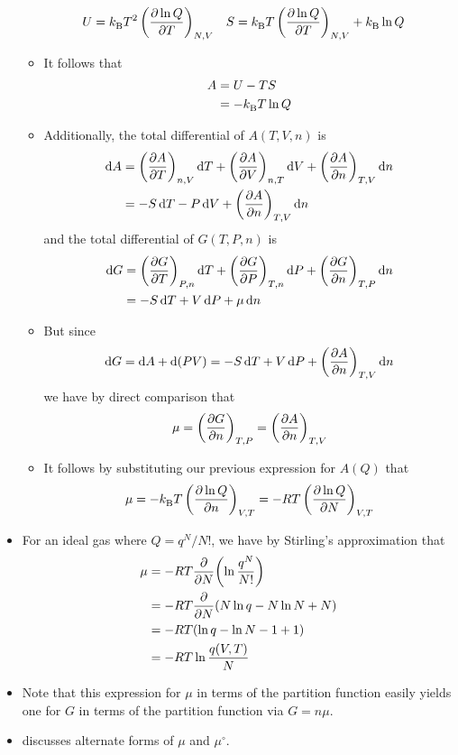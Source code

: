 \documentclass[../notes.tex]{subfiles}
\begin{document}
\begin{itemize}
\begin{itemize}
\begin{align*}
            U &= {k_\text{B}^{}} T^2\left( \pdv{\ln Q}{T} \right)_{N,V}&
            S &= {k_\text{B}^{}} T\left( \pdv{\ln Q}{T} \right)_{N,V}+{k_\text{B}^{}}\ln Q
        \end{align*}
        \item It follows that
        \begin{align*}
            A &= U-TS\\
            &= -{k_\text{B}^{}} T\ln Q
        \end{align*}
        \item Additionally, the total differential of $A(T,V,n)$ is
        \begin{align*}
            \dd{A} &= \left( \pdv{A}{T} \right)_{n,V}\dd{T}+\left( \pdv{A}{V} \right)_{n,T}\dd{V}+\left( \pdv{A}{n} \right)_{T,V}\dd{n}\\
            &= -S\dd{T}-P\dd{V}+\left( \pdv{A}{n} \right)_{T,V}\dd{n}
        \end{align*}
        and the total differential of $G(T,P,n)$ is
        \begin{align*}
            \dd{G} &= \left( \pdv{G}{T} \right)_{P,n}\dd{T}+\left( \pdv{G}{P} \right)_{T,n}\dd{P}+\left( \pdv{G}{n} \right)_{T,P}\dd{n}\\
            &= -S\dd{T}+V\dd{P}+\mu\dd{n}
        \end{align*}
        \item But since
        \begin{equation*}
            \dd{G} = \dd{A}+\dd{(PV)}
            = -S\dd{T}+V\dd{P}+\left( \pdv{A}{n} \right)_{T,V}\dd{n}
        \end{equation*}
        we have by direct comparison that
        \begin{equation*}
            \mu = \left( \pdv{G}{n} \right)_{T,P}
            = \left( \pdv{A}{n} \right)_{T,V}
        \end{equation*}
        \item It follows by substituting our previous expression for $A(Q)$ that
        \begin{equation*}
            \mu = -{k_\text{B}^{}} T\left( \pdv{\ln Q}{n} \right)_{V,T}
            = -RT\left( \pdv{\ln Q}{N} \right)_{V,T}
        \end{equation*}
    \end{itemize}
    \item For an ideal gas where $Q=q^N/N!$, we have by Stirling's approximation that
    \begin{align*}
        \mu &= -RT\pdv{N}(\ln\frac{q^N}{N!})\\
        &= -RT\pdv{N}(N\ln q-N\ln N+N)\\
        &= -RT(\ln q-\ln N-1+1)\\
        &= -RT\ln\frac{q(V,T)}{N}
    \end{align*}
    \item Note that this expression for $\mu$ in terms of the partition function easily yields one for $G$ in terms of the partition function via $G=n\mu$.
    \item \textcite{bib:McQuarrieSimon} discusses alternate forms of $\mu$ and $\mu^\circ$.
\end{itemize}
\end{document}
